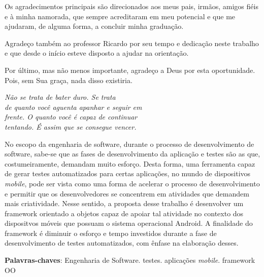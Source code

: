 \documentclass[
    12pt,       %
    openright,      %
    twoside,      %
    a4paper,      %
    english,      %
    french,       %
    spanish,      %
    brazil,       %
    ]{abntex2}
\begin{document}
  \begin{agradecimentos}
  Os agradecimentos principais são direcionados aos meus pais, irmãos,
  amigos fiéis e à minha namorada, que sempre acreditaram em meu potencial
  e que me ajudaram, de alguma forma, a concluir minha graduação.

  Agradeço também ao professor Ricardo por seu tempo e dedicação neste trabalho e que desde o início esteve disposto a ajudar na orientação.

  Por último, mas não menos importante, agradeço a Deus por esta oportunidade. Pois, sem Sua graça, nada disso existiria.

  \end{agradecimentos}

  \begin{epigrafe}
      \vspace*{\fill}
    \begin{flushright}
      \textit{Não se trata de bater duro. Se trata \\
       de quanto você aguenta apanhar e seguir em \\
       frente. O quanto você é capaz de continuar \\
       tentando. É assim que se consegue vencer.}
    \end{flushright}
  \end{epigrafe}


  \begin{resumo}
    No escopo da engenharia de software, durante o processo de desenvolvimento
    de software, sabe-se que as fases de desenvolvimento da aplicação e testes são as que,
    costumeiramente, demandam muito esforço. Desta forma, uma ferramenta capaz
    de gerar testes automatizados para certas aplicações, no mundo de
    dispositivos \textit{mobile}, pode ser vista como uma forma de acelerar o processo de
    desenvolvimento e permitir que os desenvolvedores se concentrem em
    atividades que demandem mais criatividade. Nesse
    sentido, a proposta desse trabalho é desenvolver um framework orientado
    a objetos capaz de apoiar tal atividade no contexto dos dispositvos móveis
    que possuam o sistema operacional Android. A finalidade do framework é diminuir
    o esforço e tempo investidos durante a fase de desenvolvimento de testes automatizados,
    com ênfase na elaboração desses.

   \vspace{\onelineskip}

   \noindent
   \textbf{Palavras-chaves}: Engenharia de Software. testes. aplicações \textit{mobile}.
   framework OO
  \end{resumo}
\end{document}
